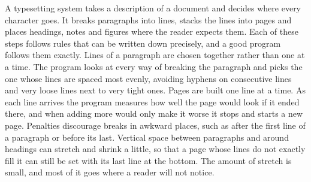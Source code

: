 \documentclass{article}
\begin{document}
A typesetting system takes a description of a document and decides where every character goes. It breaks paragraphs into lines, stacks the lines into pages and places headings, notes and figures where the reader expects them. Each of these steps follows rules that can be written down precisely, and a good program follows them exactly.
\newpage
Lines of a paragraph are chosen together rather than one at a time. The program looks at every way of breaking the paragraph and picks the one whose lines are spaced most evenly, avoiding hyphens on consecutive lines and very loose lines next to very tight ones.
\clearpage
Pages are built one line at a time. As each line arrives the program measures how well the page would look if it ended there, and when adding more would only make it worse it stops and starts a new page. Penalties discourage breaks in awkward places, such as after the first line of a paragraph or before its last.
\pagebreak
Vertical space between paragraphs and around headings can stretch and shrink a little, so that a page whose lines do not exactly fill it can still be set with its last line at the bottom. The amount of stretch is small, and most of it goes where a reader will not notice.
\end{document}
